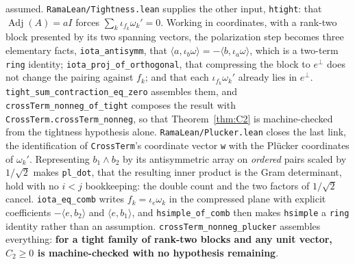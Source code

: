 \documentclass[11pt]{article}
\theoremstyle{remark}
\begin{document}
assumed. \texttt{RamaLean/Tightness.lean} supplies the other input, \texttt{htight}: that
$\operatorname{Adj}(A)=aI$ forces $\sum_k\iota_{f_k}\omega_k'=0$. Working in coordinates,
with a rank-two block presented by its two spanning vectors, the polarization step becomes
three elementary facts, \texttt{iota\_antisymm}, that
$\langle a,\iota_b\omega\rangle=-\langle b,\iota_a\omega\rangle$, which is a two-term
\texttt{ring} identity; \texttt{iota\_proj\_of\_orthogonal}, that compressing the block to
$e^\perp$ does not change the pairing against $f_k$; and that each $\iota_{f_k}\omega_k'$
already lies in $e^\perp$. \texttt{tight\_sum\_contraction\_eq\_zero} assembles them, and
\texttt{crossTerm\_nonneg\_of\_tight} composes the result with
\texttt{CrossTerm.crossTerm\_nonneg}, so that Theorem~\ref{thm:C2} is machine-checked from
the tightness hypothesis alone. \texttt{RamaLean/Plucker.lean} closes the last link, the identification of
\texttt{CrossTerm}'s coordinate vector \texttt{w} with the Pl\"ucker coordinates of
$\omega_k'$. Representing $b_1\wedge b_2$ by its antisymmetric array on \emph{ordered}
pairs scaled by $1/\sqrt2$ makes \texttt{pl\_dot}, that the resulting inner product is the
Gram determinant, hold with no $i<j$ bookkeeping: the double count and the two factors of
$1/\sqrt2$ cancel. \texttt{iota\_eq\_comb} writes $f_k=\iota_e\omega_k$ in the compressed
plane with explicit coefficients $-\langle e,b_2\rangle$ and $\langle e,b_1\rangle$, and
\texttt{hsimple\_of\_comb} then makes \texttt{hsimple} a \texttt{ring} identity rather
than an assumption. \texttt{crossTerm\_nonneg\_plucker} assembles everything:
\textbf{for a tight family of rank-two blocks and any unit vector, $C_2\ge0$ is
machine-checked with no hypothesis remaining}.
\end{document}
